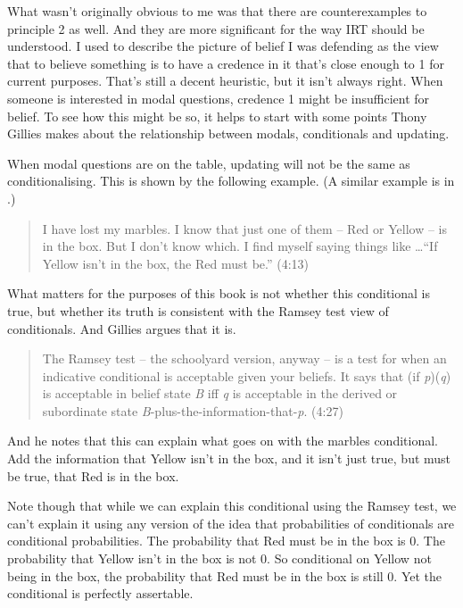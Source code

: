 \documentclass[
  11pt,
]{book}
\begin{document}
What wasn't originally obvious to me was that there are counterexamples to principle 2 as well. And they are more significant for the way IRT should be understood. I used to describe the picture of belief I was defending as the view that to believe something is to have a credence in it that's close enough to 1 for current purposes. That's still a decent heuristic, but it isn't always right. When someone is interested in modal questions, credence 1 might be insufficient for belief. To see how this might be so, it helps to start with some points Thony Gillies \citeyearpar{Gillies2010} makes about the relationship between modals, conditionals and updating.

When modal questions are on the table, updating will not be the same as conditionalising. This is shown by the following example. (A similar example is in \citet[94]{Kratzer2012}.)

\begin{quote}
I have lost my marbles. I know that just one of them -- Red or Yellow -- is in the box. But I don't know which. I find myself saying things like \ldots{}``If Yellow isn't in the box, the Red must be.'' (4:13)
\end{quote}

What matters for the purposes of this book is not whether this conditional is true, but whether its truth is consistent with the Ramsey test view of conditionals. And Gillies argues that it is.

\begin{quote}
The Ramsey test -- the schoolyard version, anyway -- is a test for when an indicative conditional is acceptable given your beliefs. It says that (if \emph{p})(\emph{q}) is acceptable in belief state \emph{B} iff \emph{q} is acceptable in the derived or subordinate state \emph{B}-plus-the-information-that-\emph{p}. (4:27)
\end{quote}

And he notes that this can explain what goes on with the marbles conditional. Add the information that Yellow isn't in the box, and it isn't just true, but must be true, that Red is in the box.

Note though that while we can explain this conditional using the Ramsey test, we can't explain it using any version of the idea that probabilities of conditionals are conditional probabilities. The probability that Red must be in the box is 0. The probability that Yellow isn't in the box is not 0. So conditional on Yellow not being in the box, the probability that Red must be in the box is still 0. Yet the conditional is perfectly assertable.
\end{document}
